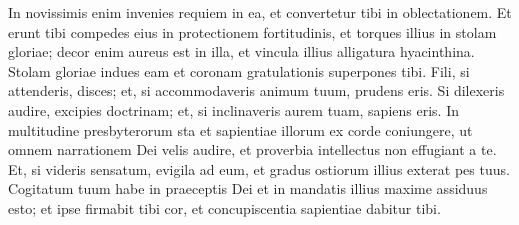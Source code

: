 \begin{biblechapter}
\verse In novissimis enim invenies requiem in ea, et convertetur tibi in oblectationem. 
\verse Et erunt tibi compedes eius in protectionem fortitudinis, et torques illius in stolam gloriae; 
\verse decor enim aureus est in illa, et vincula illius alligatura hyacinthina. 
\verse Stolam gloriae indues eam et coronam gratulationis superpones tibi. 
\verse Fili, si attenderis, disces; et, si accommodaveris animum tuum, prudens eris. 
\verse Si dilexeris audire, excipies doctrinam; et, si inclinaveris aurem tuam, sapiens eris. 
\verse In multitudine presbyterorum sta et sapientiae illorum ex corde coniungere, ut omnem narrationem Dei velis audire, et proverbia intellectus non effugiant a te. 
\verse Et, si videris sensatum, evigila ad eum, et gradus ostiorum illius exterat pes tuus. 
\verse Cogitatum tuum habe in praeceptis Dei et in mandatis illius maxime assiduus esto; et ipse firmabit tibi cor, et concupiscentia sapientiae dabitur tibi. 
\end{biblechapter}

